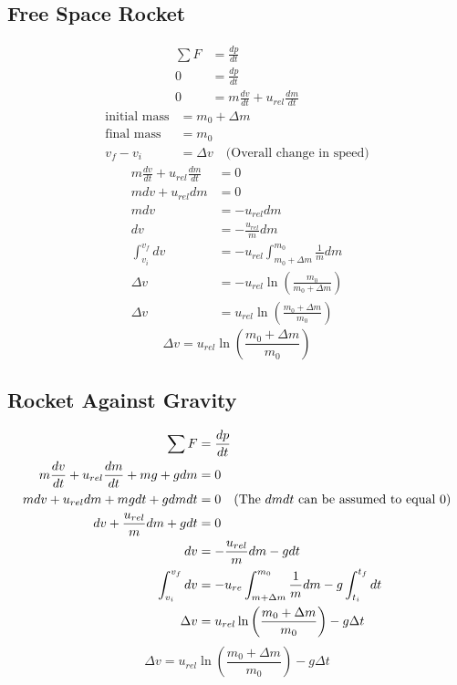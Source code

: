 \documentclass{article}
\begin{document}
\subsection{Free Space Rocket}

\begin{align*}
	\sum F & = \frac{dp}{dt} \\
	0 & = \frac{dp}{dt} \\
	0 & = m\frac{dv}{dt} + u_{rel}\frac{dm}{dt}
\end{align*}
\begin{align*}
	\text{initial mass} & = m_0 + \Delta m \\
	\text{final mass} & = m_0 \\
	v_f - v_i & = \Delta v \quad \text{(Overall change in speed)}
\end{align*}
\begin{align*}
	m\frac{dv}{dt} + u_{rel}\frac{dm}{dt} & = 0 \\
	mdv + u_{rel}dm & = 0 \\
	mdv & = -u_{rel}dm \\
	dv & = -\frac{u_{rel}}{m}dm \\
	\int_{v_i}^{v_f} dv & = -u_{rel} \int_{m_0 + \Delta m}^{m_0} \frac{1}{m} dm \\
	\Delta v & = -u_{rel}\ln \left( \frac{m_0}{m_0 + \Delta m} \right) \\
	\Delta v & = u_{rel}\ln \left( \frac{m_0 + \Delta m}{m_0} \right)
\end{align*}
\begin{equation}
	\Delta v = u_{rel}\ln \left( \frac{m_0 + \Delta m}{m_0} \right)
\end{equation}

\subsection{Rocket Against Gravity}

\begin{align*}
	\sum F & = \frac{dp}{dt} \\
	m\frac{dv}{dt} + u_{rel}\frac{dm}{dt} + mg + gdm & = 0 \\
	mdv + u_{rel}dm + mgdt + gdmdt & = 0 \quad \text{(The $ dmdt $ can be assumed to equal $ 0 $)} \\
	dv + \frac{u_{rel}}{m}dm + gdt & = 0 \\
	dv & = -\frac{u_{rel}}{m}dm - gdt \\
	\int_{v_i}^{v_f} dv & = -u_{re} \int_{m + \Delta m}^{m_0} \frac{1}{m} dm - g\int_{t_i}^{t_f} dt \\
	\Delta v & = u_{rel} \ln \left( \frac{m_0 + \Delta m}{m_0} \right) - g\Delta t
\end{align*}
\begin{equation}
	\Delta v = u_{rel} \ln \left( \frac{m_0 + \Delta m}{m_0} \right) - g\Delta t
\end{equation}
\end{document}
